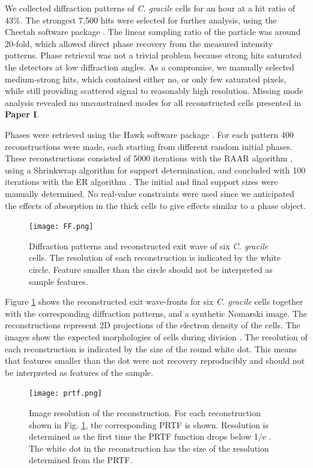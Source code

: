 We collected diffraction patterns of \textit{C. gracile} cells for an hour at a hit ratio of 43\%. The strongest 7,500 hits were selected for further analysis, using the Cheetah software package \cite{Barty2014}. The linear sampling ratio of the particle was around 20-fold, which allowed direct phase recovery from the measured intensity patterns. Phase retrieval was not a trivial problem because strong hits saturated the detectors at low diffraction angles. As a compromise, we manually selected medium-strong hits, which contained either no, or only few saturated pixels, while still providing scattered signal to reasonably high resolution. Missing mode analysis revealed no unconstrained modes for all reconstructed cells presented in \textbf{Paper I}. 

Phases were retrieved using the Hawk software package \cite{Maia2010}. For each pattern 400 reconstructions were made, each starting from different random initial phases. These reconstructions consisted of 5000 iterations with the RAAR algorithm \cite{Luke2005}, using a Shrinkwrap algorithm \cite{Marchesini2003} for support determination, and concluded with 100 iterations with the ER algorithm \cite{Fienup1978, Fienup1982}. The initial and final support sizes were manually determined. No real-value constraints were used since we anticipated the effects of absorption in the thick cells to give effects similar to a phase object. 

\begin{figure}[!h]
	\centering 
		\texttt{[image: FF.png]}
	\caption{Diffraction patterns and reconstructed exit wave of six \textit{C. gracile} cells. The resolution of each reconstruction is indicated by the white circle. Feature smaller than the circle should not be interpreted as sample features.}
	\label{fig:Reconstructions}
\end{figure}

Figure \ref{fig:Reconstructions} shows the reconstructed exit wave-fronts for six \textit{C. gracile} cells together with the corresponding diffraction patterns, and a synthetic Nomarski image. The reconstructions represent 2D projections of the electron density of the cells. The images show the expected morphologies of cells during division \cite{Komarek1999,Bazire1988}. The resolution of each reconstruction is indicated by the size of the round white dot. This means that features smaller than the dot were not recovery reproducibly and should not be interpreted as features of the sample.

\begin{figure}[!h]
	\centering 
		\texttt{[image: prtf.png]}
	\caption{Image resolution of the reconstruction. For each reconstruction shown in Fig. \ref{fig:Reconstructions}, the corresponding PRTF is shown. Resolution is determined as the first time the PRTF function drops below 1/e \cite{Seibert2011}. The white dot in the reconstruction has the size of the resolution determined from the PRTF.}
	\label{fig:PRTF}
\end{figure}

